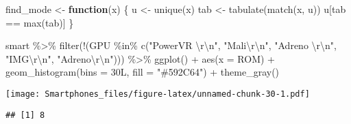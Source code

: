 \documentclass[
]{article}
\newenvironment{Shaded}{\begin{snugshade}}{\end{snugshade}}
\newcommand{\AttributeTok}[1]{\textcolor[rgb]{0.77,0.63,0.00}{#1}}
\newcommand{\CommentTok}[1]{\textcolor[rgb]{0.56,0.35,0.01}{\textit{#1}}}
\newcommand{\ControlFlowTok}[1]{\textcolor[rgb]{0.13,0.29,0.53}{\textbf{#1}}}
\newcommand{\FunctionTok}[1]{\textcolor[rgb]{0.00,0.00,0.00}{#1}}
\newcommand{\NormalTok}[1]{#1}
\newcommand{\OtherTok}[1]{\textcolor[rgb]{0.56,0.35,0.01}{#1}}
\newcommand{\SpecialCharTok}[1]{\textcolor[rgb]{0.00,0.00,0.00}{#1}}
\newcommand{\StringTok}[1]{\textcolor[rgb]{0.31,0.60,0.02}{#1}}
\begin{document}
\begin{Shaded}
\begin{Highlighting}[]
\NormalTok{  find\_mode }\OtherTok{\textless{}{-}} \ControlFlowTok{function}\NormalTok{(x) \{}
\NormalTok{  u }\OtherTok{\textless{}{-}} \FunctionTok{unique}\NormalTok{(x)}
\NormalTok{  tab }\OtherTok{\textless{}{-}} \FunctionTok{tabulate}\NormalTok{(}\FunctionTok{match}\NormalTok{(x, u))}
\NormalTok{  u[tab }\SpecialCharTok{==} \FunctionTok{max}\NormalTok{(tab)]}
\NormalTok{\}}

\NormalTok{smart }\SpecialCharTok{\%\textgreater{}\%}
 \FunctionTok{filter}\NormalTok{(}\SpecialCharTok{!}\NormalTok{(GPU }\SpecialCharTok{\%in\%} \FunctionTok{c}\NormalTok{(}\StringTok{"PowerVR }\SpecialCharTok{\textbackslash{}r\textbackslash{}n}\StringTok{"}\NormalTok{, }\StringTok{"Mali}\SpecialCharTok{\textbackslash{}r\textbackslash{}n}\StringTok{"}\NormalTok{, }\StringTok{"Adreno }\SpecialCharTok{\textbackslash{}r\textbackslash{}n}\StringTok{"}\NormalTok{, }\StringTok{"IMG}\SpecialCharTok{\textbackslash{}r\textbackslash{}n}\StringTok{"}\NormalTok{, }\StringTok{"Adreno}\SpecialCharTok{\textbackslash{}r\textbackslash{}n}\StringTok{"}\NormalTok{))) }\SpecialCharTok{\%\textgreater{}\%}
 \FunctionTok{ggplot}\NormalTok{() }\SpecialCharTok{+}
  \FunctionTok{aes}\NormalTok{(}\AttributeTok{x =}\NormalTok{ ROM) }\SpecialCharTok{+}
  \FunctionTok{geom\_histogram}\NormalTok{(}\AttributeTok{bins =}\NormalTok{ 30L, }\AttributeTok{fill =} \StringTok{"\#592C64"}\NormalTok{) }\SpecialCharTok{+}
  \FunctionTok{theme\_gray}\NormalTok{()}
\end{Highlighting}
\end{Shaded}

\texttt{[image: Smartphones\_files/figure-latex/unnamed-chunk-30-1.pdf]}

\begin{Shaded}
\end{Shaded}

\begin{verbatim}
## [1] 8
\end{verbatim}
\end{document}
